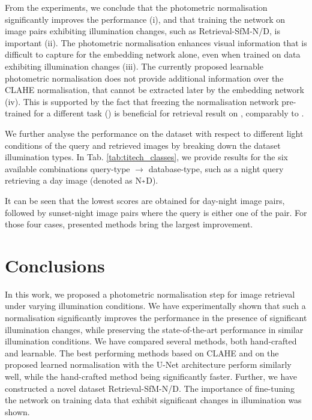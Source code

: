 \vspace{.5\baselineskip} From the experiments, we conclude that the photometric normalisation significantly improves the performance (i), and that training the network on image pairs exhibiting illumination changes, such as Retrieval-SfM-N/D, is important (ii). The photometric normalisation enhances visual information that is difficult to capture for the embedding network alone, even when trained on data exhibiting illumination changes (iii). The currently proposed learnable photometric normalisation does not provide additional information over the CLAHE normalisation, that cannot be extracted later by the embedding network (iv). This is supported by the fact that freezing the normalisation network pre-trained for a different task () is beneficial for retrieval result on \Tokyo, comparably to .

We further analyse the performance on the \Tokyo dataset with respect to different light conditions of the query and retrieved images by breaking down the dataset illumination types. In Tab. \ref{tab:titech_classes}, we provide results for the six available combinations query-type $\to$ database-type, such as a night query retrieving a day image (denoted as N$\veryshortarrow$D).

It can be seen that the lowest scores are obtained for day-night image pairs, followed by sunset-night image pairs where the query is either one of the pair. For those four cases, presented methods bring the largest improvement.


\section{Conclusions}

In this work, we proposed a photometric normalisation step for image retrieval under varying illumination conditions. We have experimentally shown that such a normalisation significantly improves the performance in the presence of significant illumination changes, while preserving the state-of-the-art performance in similar illumination conditions. We have compared several methods, both hand-crafted and learnable. The best performing methods based on CLAHE and on the proposed learned normalisation with the U-Net architecture perform similarly well, while the hand-crafted method being significantly faster. 
Further, we have constructed a novel dataset Retrieval-SfM-N/D. The importance of fine-tuning the network on training data that exhibit significant changes in illumination was shown.
 
